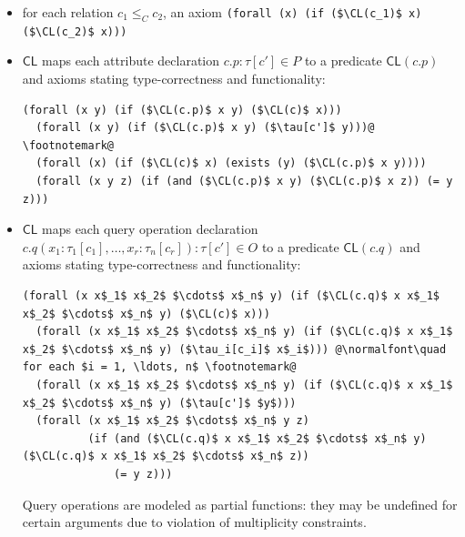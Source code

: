 \documentclass[10pt, a4paper]{isov2}
\newcommand*{\CL}{\ensuremath{\mathsf{CL}}\xspace}
\begin{document}
\begin{itemize}[topsep=0pt, label=--, leftmargin=*]
  \item for each relation $c_1 \leq_C c_2$, an axiom %
\lstinline[language=clif, mathescape]!(forall (x) (if ($\CL(c_1)$ x) ($\CL(c_2)$ x)))!

  \item $\CL$
maps each attribute declaration $c.p : \tau[c'] \in P$
to a predicate $\CL(c.p)$
and axioms stating type-correctness and functionality:
%
\begin{lstlisting}[language=clif, mathescape, escapechar=@]
  (forall (x y) (if ($\CL(c.p)$ x y) ($\CL(c)$ x)))
  (forall (x y) (if ($\CL(c.p)$ x y) ($\tau[c']$ y)))@ \footnotemark@
  (forall (x) (if ($\CL(c)$ x) (exists (y) ($\CL(c.p)$ x y))))
  (forall (x y z) (if (and ($\CL(c.p)$ x y) ($\CL(c.p)$ x z)) (= y z)))
\end{lstlisting}%

  \item $\CL$
maps each query operation declaration
$c.q(x_1 : \tau_1[c_1], \dots, x_r : \tau_n[c_r]) : \tau[c'] \in O$
to a predicate $\CL(c.q)$
and axioms stating type-correctness and functionality:
%
\begin{lstlisting}[language=clif, mathescape, escapechar=@]
  (forall (x x$_1$ x$_2$ $\cdots$ x$_n$ y) (if ($\CL(c.q)$ x x$_1$ x$_2$ $\cdots$ x$_n$ y) ($\CL(c)$ x)))
  (forall (x x$_1$ x$_2$ $\cdots$ x$_n$ y) (if ($\CL(c.q)$ x x$_1$ x$_2$ $\cdots$ x$_n$ y) ($\tau_i[c_i]$ x$_i$))) @\normalfont\quad for each $i = 1, \ldots, n$ \footnotemark@
  (forall (x x$_1$ x$_2$ $\cdots$ x$_n$ y) (if ($\CL(c.q)$ x x$_1$ x$_2$ $\cdots$ x$_n$ y) ($\tau[c']$ $y$)))
  (forall (x x$_1$ x$_2$ $\cdots$ x$_n$ y z)
          (if (and ($\CL(c.q)$ x x$_1$ x$_2$ $\cdots$ x$_n$ y) ($\CL(c.q)$ x x$_1$ x$_2$ $\cdots$ x$_n$ z))
              (= y z)))
\end{lstlisting}%
%
Query operations are modeled as partial functions: they may be undefined
for certain arguments due to violation of multiplicity constraints.


\end{itemize}
\end{document}
